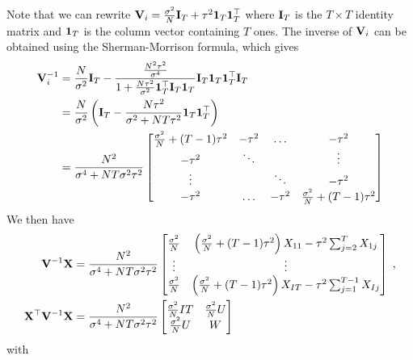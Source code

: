 \documentclass[10pt]{article}
\begin{document}
Note that we can rewrite $\mathbf{V}_i=\frac{\sigma^2}{N}\mathbf{I}_T+\tau^2\mathbf{1}_T\mathbf{1}_T^\top$ where $\mathbf{I}_T$ is the $T\times T$ identity matrix and $\mathbf{1}_T$ is the column vector containing $T$ ones. The inverse of $\mathbf{V}_i$ can be obtained using the Sherman-Morrison formula, which gives
\begin{align*}
\mathbf{V}_i^{-1} &= \frac{N}{\sigma^2}\mathbf{I}_T - \frac{\frac{N^2\tau^2}{\sigma^4}}{1+\frac{N\tau^2}{\sigma^2}\mathbf{1}_T^\top\mathbf{I}_T\mathbf{1}_T}\mathbf{I}_T\mathbf{1}_T\mathbf{1}_T^\top\mathbf{I}_T \\
&= \frac{N}{\sigma^2}\left(\mathbf{I}_T - \frac{N\tau^2}{\sigma^2+NT\tau^2}\mathbf{1}_T\mathbf{1}_T^\top\right) \\
&= \frac{N^2}{\sigma^4+NT\sigma^2\tau^2}
\begin{bmatrix}
\frac{\sigma^2}{N}+(T-1)\tau^2 & -\tau^2 & \ldots & -\tau^2 \\
-\tau^2 & \ddots & & \vdots \\
\vdots & & \ddots & -\tau^2 \\
-\tau^2 & \ldots & -\tau^2 & \frac{\sigma^2}{N}+(T-1)\tau^2
\end{bmatrix}
\end{align*}
We then have
\begin{align*}
\mathbf{V}^{-1}\mathbf{X} &= \frac{N^2}{\sigma^4+NT\sigma^2\tau^2}
\begin{bmatrix}
\frac{\sigma^2}{N} & \left(\frac{\sigma^2}{N}+(T-1)\tau^2\right)X_{11} -\tau^2\sum_{j=2}^TX_{1j} \\
\vdots & \vdots \\
\frac{\sigma^2}{N} & \left(\frac{\sigma^2}{N}+(T-1)\tau^2\right)X_{IT} -\tau^2\sum_{j=1}^{T-1}X_{Ij}
\end{bmatrix} \;, \\
\mathbf{X}^\top\mathbf{V}^{-1}\mathbf{X} &= \frac{N^2}{\sigma^4+NT\sigma^2\tau^2}
\begin{bmatrix}
\frac{\sigma^2}{N}IT & \frac{\sigma^2}{N}U \\
\frac{\sigma^2}{N}U & W
\end{bmatrix}
\end{align*}
with
\end{document}
